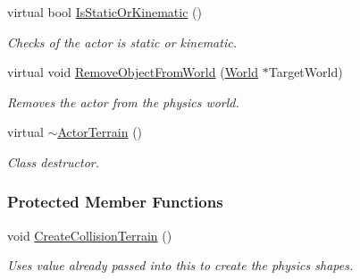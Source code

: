 \begin{DoxyCompactItemize}
virtual bool \hyperlink{classphys_1_1ActorTerrain_a37d0fb3d028ac1946e3553f7f0eef56d}{IsStaticOrKinematic} ()
\begin{DoxyCompactList}\small\item\em Checks of the actor is static or kinematic. \item\end{DoxyCompactList}\item 
virtual void \hyperlink{classphys_1_1ActorTerrain_aeded1fdabfc4dd407f81fcc5b97c1f77}{RemoveObjectFromWorld} (\hyperlink{classphys_1_1World}{World} $\ast$TargetWorld)
\begin{DoxyCompactList}\small\item\em Removes the actor from the physics world. \item\end{DoxyCompactList}\item 
virtual \hyperlink{classphys_1_1ActorTerrain_af6ef2e3694b7afe0b59cfa0909c0490c}{$\sim$ActorTerrain} ()
\begin{DoxyCompactList}\small\item\em Class destructor. \item\end{DoxyCompactList}\end{DoxyCompactItemize}
\subsubsection*{Protected Member Functions}
\begin{DoxyCompactItemize}
\item 
\hypertarget{classphys_1_1ActorTerrain_ade758919c0f2b58ad1fe4bfd388d79af}{
void \hyperlink{classphys_1_1ActorTerrain_ade758919c0f2b58ad1fe4bfd388d79af}{CreateCollisionTerrain} ()}
\label{classphys_1_1ActorTerrain_ade758919c0f2b58ad1fe4bfd388d79af}

\begin{DoxyCompactList}\small\item\em Uses value already passed into this to create the physics shapes. \item\end{DoxyCompactList}\end{DoxyCompactItemize}
